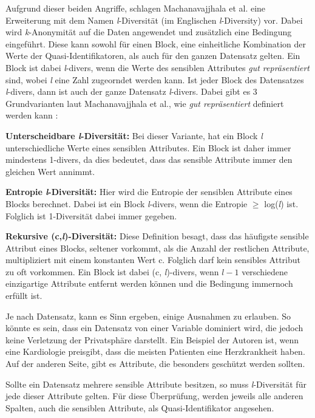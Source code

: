 Aufgrund dieser beiden Angriffe, schlagen Machanavajjhala et al. \cite{P-24} eine Erweiterung mit dem Namen \textit{l}-Diversität (im Englischen \textit{l}-Diversity) vor.
Dabei wird \textit{k}-Anonymität auf die Daten angewendet und zusätzlich eine Bedingung eingeführt. 
Diese kann sowohl für einen Block, eine einheitliche Kombination der Werte der Quasi-Identifikatoren, als auch für den ganzen Datensatz gelten.
Ein Block ist dabei \textit{l}-divers, wenn die Werte des sensiblen Attributes \textit{\dq gut repräsentiert\dq} sind, wobei \textit{l} eine Zahl zugeorndet werden kann.
Ist jeder Block des Datensatzes \textit{l}-divers, dann ist auch der ganze Datensatz \textit{l}-divers.
Dabei gibt es 3 Grundvarianten laut Machanavajjhala et al., wie \textit{\dq gut repräsentiert\dq} definiert werden kann \cite{P-24}:
\begin{compactitem}
\item \textbf{Unterscheidbare \textit{l}-Diversität:} Bei dieser Variante, hat ein Block \textit{l} unterschiedliche Werte eines sensiblen Attributes. Ein Block ist daher immer mindestens 1-divers, da dies bedeutet, dass das sensible Attribute immer den gleichen Wert annimmt.
\item \textbf{Entropie \textit{l}-Diversität:} Hier wird die Entropie der sensiblen Attribute eines Blocks berechnet. Dabei ist ein Block \textit{l}-divers, wenn die Entropie $\ge$ log(\textit{l}) ist. Folglich ist 1-Diversität dabei immer gegeben.
\item \textbf{Rekursive (c,\textit{l})-Diversität:} Diese Definition besagt, dass das häufigste sensible Attribut eines Blocks, seltener vorkommt, als die Anzahl der restlichen Attribute, multipliziert mit einem konstanten Wert c. Folglich darf kein sensibles Attribut zu oft vorkommen. Ein Block ist dabei (c, \textit{l})-divers, wenn $\textit{l} - 1$ verschiedene einzigartige Attribute entfernt werden können und die Bedingung immernoch erfüllt ist.
\end{compactitem}

Je nach Datensatz, kann es Sinn ergeben, einige Ausnahmen zu erlauben.
So könnte es sein, dass ein Datensatz von einer Variable dominiert wird, die jedoch keine Verletzung der Privatsphäre darstellt. 
Ein Beispiel der Autoren ist, wenn eine Kardiologie preisgibt, dass die meisten Patienten eine Herzkrankheit haben.
Auf der anderen Seite, gibt es Attribute, die besonders geschützt werden sollten.

Sollte ein Datensatz mehrere sensible Attribute besitzen, so muss \textit{l}-Diversität für jede dieser Attribute gelten. 
Für diese Überprüfung, werden jeweils alle anderen Spalten, auch die sensiblen Attribute, als Quasi-Identifikator angesehen.

